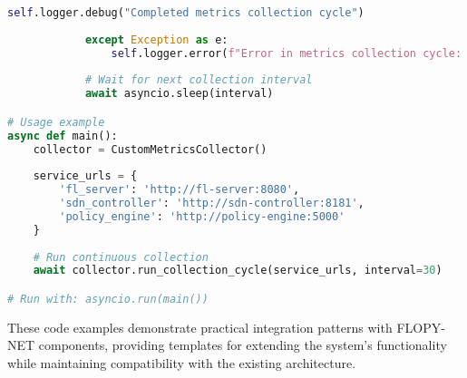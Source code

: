 \begin{lstlisting}[language=python, caption=Custom Metrics Collector]
                self.logger.debug("Completed metrics collection cycle")
                
            except Exception as e:
                self.logger.error(f"Error in metrics collection cycle: {e}")
            
            # Wait for next collection interval
            await asyncio.sleep(interval)

# Usage example
async def main():
    collector = CustomMetricsCollector()
    
    service_urls = {
        'fl_server': 'http://fl-server:8080',
        'sdn_controller': 'http://sdn-controller:8181',
        'policy_engine': 'http://policy-engine:5000'
    }
    
    # Run continuous collection
    await collector.run_collection_cycle(service_urls, interval=30)

# Run with: asyncio.run(main())
\end{lstlisting}

These code examples demonstrate practical integration patterns with FLOPY-NET components, providing templates for extending the system's functionality while maintaining compatibility with the existing architecture.
